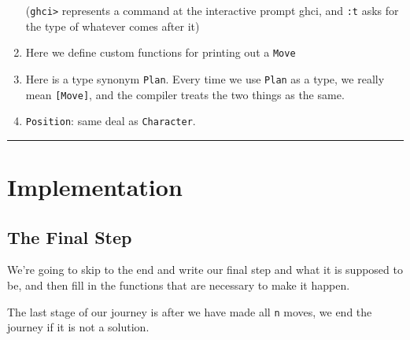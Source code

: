 \documentclass[]{article}
\newenvironment{Shaded}{}{}
\newcommand{\CommentTok}[1]{\textcolor[rgb]{0.38,0.63,0.69}{\textit{#1}}}
\newcommand{\DataTypeTok}[1]{\textcolor[rgb]{0.56,0.13,0.00}{#1}}
\newcommand{\FunctionTok}[1]{\textcolor[rgb]{0.02,0.16,0.49}{#1}}
\newcommand{\KeywordTok}[1]{\textcolor[rgb]{0.00,0.44,0.13}{\textbf{#1}}}
\newcommand{\NormalTok}[1]{#1}
\newcommand{\OtherTok}[1]{\textcolor[rgb]{0.00,0.44,0.13}{#1}}
\begin{document}
\begin{enumerate}
  (\texttt{ghci\textgreater{}} represents a command at the interactive prompt
  ghci, and \texttt{:t} asks for the type of whatever comes after it)
\item
  Here we define custom functions for printing out a \texttt{Move}
\item
  Here is a type synonym \texttt{Plan}. Every time we use \texttt{Plan} as a
  type, we really mean \texttt{{[}Move{]}}, and the compiler treats the two
  things as the same.
\item
  \texttt{Position}: same deal as \texttt{Character}.
\end{enumerate}

\begin{center}\rule{0.5\linewidth}{\linethickness}\end{center}

\hypertarget{implementation}{%
\section{Implementation}\label{implementation}}

\hypertarget{the-final-step}{%
\subsection{The Final Step}\label{the-final-step}}

We're going to skip to the end and write our final step and what it is supposed
to be, and then fill in the functions that are necessary to make it happen.

The last stage of our journey is after we have made all \texttt{n} moves, we end
the journey if it is not a solution.

\begin{Shaded}
\end{Shaded}
\end{document}
